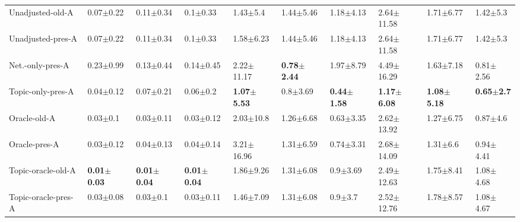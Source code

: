 \begin{tabular}{llllllllll}
Unadjusted-old-A    &           0.07$\pm$0.22 &           0.11$\pm$0.34 &            0.1$\pm$0.33 &            1.43$\pm$5.4 &           1.44$\pm$5.46 &           1.18$\pm$4.13 &          2.64$\pm$11.58 &           1.71$\pm$6.77 &           1.42$\pm$5.3 \\
Unadjusted-pres-A   &           0.07$\pm$0.22 &           0.11$\pm$0.34 &            0.1$\pm$0.33 &           1.58$\pm$6.23 &           1.44$\pm$5.46 &           1.18$\pm$4.13 &          2.64$\pm$11.58 &           1.71$\pm$6.77 &           1.42$\pm$5.3 \\
Net.-only-pres-A    &           0.23$\pm$0.99 &           0.13$\pm$0.44 &           0.14$\pm$0.45 &          2.22$\pm$11.17 &  \textbf{0.78$\pm$2.44} &           1.97$\pm$8.79 &          4.49$\pm$16.29 &           1.63$\pm$7.18 &          0.81$\pm$2.56 \\
Topic-only-pres-A   &           0.04$\pm$0.12 &           0.07$\pm$0.21 &            0.06$\pm$0.2 &  \textbf{1.07$\pm$5.53} &            0.8$\pm$3.69 &  \textbf{0.44$\pm$1.58} &  \textbf{1.17$\pm$6.08} &  \textbf{1.08$\pm$5.18} &  \textbf{0.65$\pm$2.7} \\
Oracle-old-A        &            0.03$\pm$0.1 &           0.03$\pm$0.11 &           0.03$\pm$0.12 &           2.03$\pm$10.8 &           1.26$\pm$6.68 &           0.63$\pm$3.35 &          2.62$\pm$13.92 &           1.27$\pm$6.75 &           0.87$\pm$4.6 \\
Oracle-pres-A       &           0.03$\pm$0.12 &           0.04$\pm$0.13 &           0.04$\pm$0.14 &          3.21$\pm$16.96 &           1.31$\pm$6.59 &           0.74$\pm$3.31 &          2.68$\pm$14.09 &            1.31$\pm$6.6 &          0.94$\pm$4.41 \\
Topic-oracle-old-A  &  \textbf{0.01$\pm$0.03} &  \textbf{0.01$\pm$0.04} &  \textbf{0.01$\pm$0.04} &           1.86$\pm$9.26 &           1.31$\pm$6.08 &            0.9$\pm$3.69 &          2.49$\pm$12.63 &           1.75$\pm$8.41 &          1.08$\pm$4.68 \\
Topic-oracle-pres-A &           0.03$\pm$0.08 &            0.03$\pm$0.1 &           0.03$\pm$0.11 &           1.46$\pm$7.09 &           1.31$\pm$6.08 &             0.9$\pm$3.7 &          2.52$\pm$12.76 &           1.78$\pm$8.57 &          1.08$\pm$4.67 \\
\bottomrule
\end{tabular}
